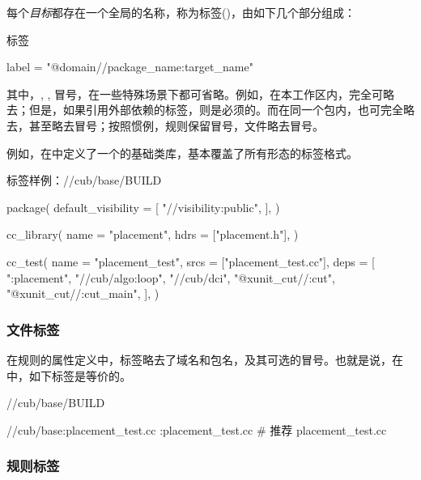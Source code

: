 \begin{content}
每个\emph{目标}都存在一个全局的名称，称为标签()，由如下几个部分组成：

\begin{nodiff}{标签}
 \begin{c++}
label = "@domain//package_name:target_name"
 \end{c++}
\end{nodiff}

其中，, , 冒号，在一些特殊场景下都可省略。例如，在本工作区内，完全可略去；但是，如果引用外部依赖的标签，则是必须的。而在同一个包内，也可完全略去，甚至略去冒号；按照惯例，规则保留冒号，文件略去冒号。

例如，在中定义了一个的基础类库，基本覆盖了所有形态的标签格式。

\begin{nodiff}{标签样例：//cub/base/BUILD}
 \begin{python}
package(
    default_visibility = [    
        "//visibility:public",    
    ],
)

cc_library(
    name = "placement",
    hdrs = ["placement.h"],
)

cc_test(
    name = "placement_test",
    srcs = ["placement_test.cc"],
    deps = [ 
        ":placement",
        "//cub/algo:loop",
        "//cub/dci",      
        "@xunit_cut//:cut",
        "@xunit_cut//:cut_main",
    ],  
)
 \end{python}
\end{nodiff}

\subsubsection{文件标签}

在规则的属性定义中，标签略去了域名和包名，及其可选的冒号。也就是说，在中，如下标签是等价的。

\begin{nodiff}{//cub/base/BUILD}
 \begin{python}
//cub/base:placement_test.cc
:placement_test.cc # 推荐
placement_test.cc
 \end{python}
\end{nodiff}

\subsubsection{规则标签}


\end{content}
